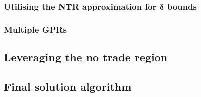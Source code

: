 \documentclass[11pt]{article}
\begin{document}
  
\subsubsection{Utilising the \ac{NTR} approximation for $\boldsymbol{\delta}$ bounds} \label{Subsubsection: NTR-deltabounds}

\subsubsection{Multiple \ac{GPR}s} \label{Subsubsection: NTR-GPR}


\subsection{Leveraging the no trade region} \label{Subsection: NTR-aproximation}
\subsection{Final solution algorithm} \label{Subsection: Algorithm}

\ifdefined\COMPILINGMAIN
\else
\end{document}
